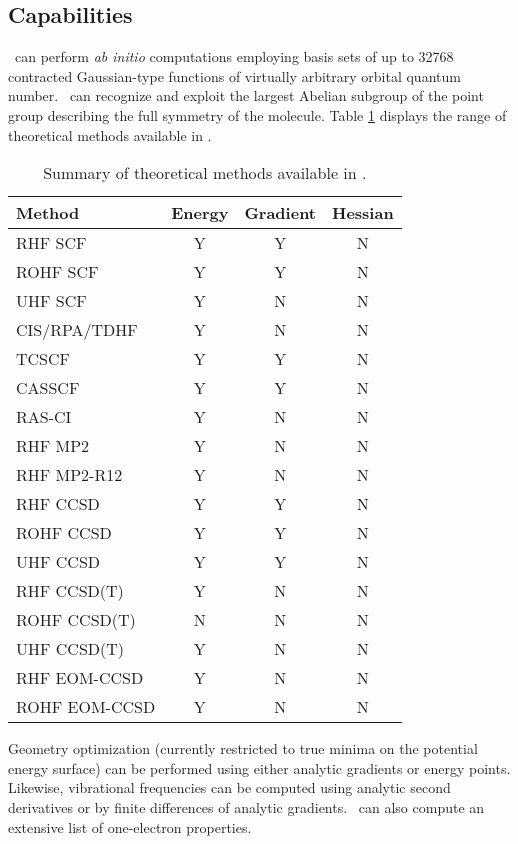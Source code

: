 \subsection{Capabilities}
\PSIthree\ can perform {\em ab initio} computations employing
basis sets of up to 32768 contracted Gaussian-type functions of
virtually arbitrary orbital quantum number.
\PSIthree\ can recognize and exploit the largest Abelian subgroup of the
point group describing the full symmetry of the molecule.
Table \ref{table:methods} displays the range of theoretical
methods available in \PSIthree .
\begin{table}
\caption{Summary of theoretical methods available in \PSIthree.} \label{table:methods}
\parsep 10pt
\begin{center}
\begin{tabular}{lccc} \hline\hline
Method        & Energy & Gradient & Hessian \\ \hline
RHF SCF       & Y & Y & N \\
ROHF SCF      & Y & Y & N \\
UHF SCF       & Y & N & N \\
CIS/RPA/TDHF  & Y & N & N \\
TCSCF         & Y & Y & N \\
CASSCF        & Y & Y & N \\
RAS-CI        & Y & N & N \\
RHF MP2       & Y & N & N \\
RHF MP2-R12   & Y & N & N \\
RHF CCSD      & Y & Y & N \\
ROHF CCSD     & Y & Y & N \\ 
UHF CCSD      & Y & Y & N \\
RHF CCSD(T)   & Y & N & N \\
ROHF CCSD(T)  & N & N & N \\
UHF CCSD(T)   & Y & N & N \\
RHF EOM-CCSD  & Y & N & N \\
ROHF EOM-CCSD & Y & N & N \\
\hline\hline
\end{tabular}
\end{center}
\end{table}
Geometry optimization (currently restricted to true minima on the potential
energy surface) can be performed using either analytic gradients
or energy points.  Likewise, vibrational frequencies can be 
computed using analytic second derivatives or by finite
differences of analytic gradients.
\PSIthree\ can also compute an extensive list of one-electron properties.


